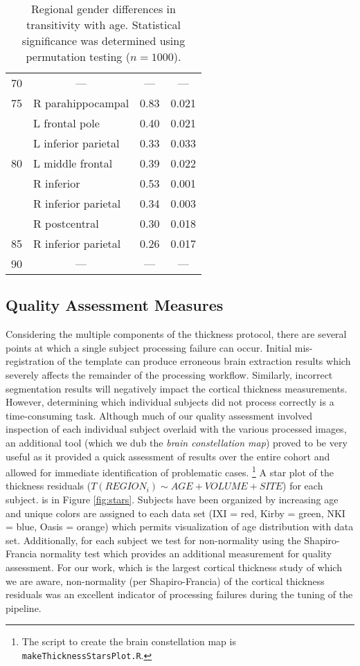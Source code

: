 \begin{table}[htb]
\begin{tabular}{c l c c}
\rowcolor{gray!40}
70 & \multicolumn{1}{c}{---} & --- & --- \\
\rowcolor{gray!20}
75 & R parahippocampal & 0.83 & 0.021 \\
\rowcolor{gray!20}
{} & L frontal pole & 0.40 & 0.021 \\
\rowcolor{gray!20}
{} & L inferior parietal & 0.33 & 0.033 \\
\rowcolor{gray!40}
80 & L middle frontal & 0.39 & 0.022 \\
\rowcolor{gray!40}
{} & R inferior & 0.53 & 0.001 \\
\rowcolor{gray!40}
{} & R inferior parietal & 0.34 & 0.003 \\
\rowcolor{gray!40}
{} & R postcentral & 0.30 & 0.018 \\
\rowcolor{gray!20}
85 & R inferior parietal & 0.26 & 0.017 \\
\rowcolor{gray!40}
90 & \multicolumn{1}{c}{---} & --- & --- \\
\bottomrule
\end{tabular}
\caption{Regional gender differences in transitivity with age.  Statistical 
significance was determined using permutation testing ($n = 1000$).
}
\label{table:genderDifference}
\end{table}

\subsection{Quality Assessment Measures}
Considering the multiple components of the thickness protocol, there are 
several points at which a single subject processing failure can occur.  Initial mis-registration of the template can produce erroneous brain extraction results
which severely affects the remainder of the processing workflow.  Similarly,
incorrect segmentation results will negatively impact the cortical thickness measurements.
However, determining which individual subjects did not process correctly is a time-consuming task.  Although much of our quality assessment involved inspection of each
individual subject overlaid with the various processed images, an additional tool (which
we dub the {\it brain constellation map}) proved to be very useful as it provided a quick
assessment of results over the entire cohort and allowed for immediate identification
of problematic cases.%
\footnote{
  The script to create the brain constellation map is  {\tt makeThicknessStarsPlot.R}.
}  
A star plot of the thickness residuals 
($T(REGION_i) \sim AGE  + VOLUME+ SITE$) for each subject.
is in Figure \ref{fig:stars}. Subjects have been organized by 
increasing age and unique colors are assigned to each 
data set (IXI = red, Kirby = green, NKI = blue, Oasis = orange)
which permits visualization of age
distribution with data set.  Additionally, for each subject we
test for non-normality using the Shapiro-Francia normality test 
\citep{royston1993} which
provides an additional measurement for quality assessment.
For our work, which is the largest cortical thickness study of 
which we are aware, non-normality (per Shapiro-Francia) of the 
cortical thickness residuals was an excellent indicator of processing 
failures  during the tuning of the pipeline.


